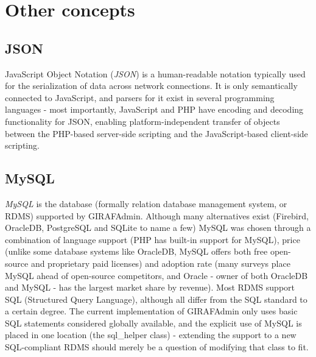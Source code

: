 \section{Other concepts}

\subsection{JSON}
JavaScript Object Notation (\emph{JSON}) is a human-readable notation typically used for the serialization of data across network connections. It is only semantically connected to JavaScript, and parsers for it exist in several programming languages - most importantly, JavaScript and PHP have encoding and decoding functionality for JSON, enabling platform-independent transfer of objects between the PHP-based server-side scripting and the JavaScript-based client-side scripting.

\subsection{MySQL}
\emph{MySQL} is the database (formally relation database management system, or RDMS) supported by GIRAFAdmin. Although many alternatives exist (Firebird, OracleDB, PostgreSQL and SQLite to name a few) MySQL was chosen through a combination of language support (PHP has built-in support for MySQL), price (unlike some database systems like OracleDB, MySQL offers both free open-source and proprietary paid licenses) and adoption rate (many surveys place MySQL ahead of open-source competitors, and Oracle - owner of both OracleDB and MySQL - has the largest market share by revenue). Most RDMS support SQL (Structured Query Language), although all differ from the SQL standard to a certain degree. The current implementation of GIRAFAdmin only uses basic SQL statements considered globally available, and the explicit use of MySQL is placed in one location (the sql\_helper class) - extending the support to a new SQL-compliant RDMS should merely be a question of modifying that class to fit.

